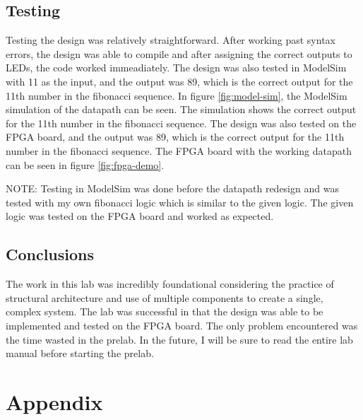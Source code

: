 \documentclass{article}
\begin{document}
\subsection*{Testing}
Testing the design was relatively straightforward. After working past syntax errors, the design was able to compile and after assigning the correct outputs to LEDs, the code worked immeadiately. The design was also tested in ModelSim with 11 as the input, and the output was 89, which is the correct output for the 11th number in the fibonacci sequence. In figure \ref{fig:model-sim}, the ModelSim simulation of the datapath can be seen. The simulation shows the correct output for the 11th number in the fibonacci sequence. The design was also tested on the FPGA board, and the output was 89, which is the correct output for the 11th number in the fibonacci sequence. The FPGA board with the working datapath can be seen in figure \ref{fig:fpga-demo}.

NOTE: Testing in ModelSim was done before the datapath redesign and was tested with my own fibonacci logic which is similar to the given logic. The given logic was tested on the FPGA board and worked as expected.

\subsection*{Conclusions}
The work in this lab was incredibly foundational considering the practice of structural architecture and use of multiple components to create a single, complex system. The lab was successful in that the design was able to be implemented and tested on the FPGA board. The only problem encountered was the time wasted in the prelab. In the future, I will be sure to read the entire lab manual before starting the prelab.

\section*{Appendix}
\end{document}
